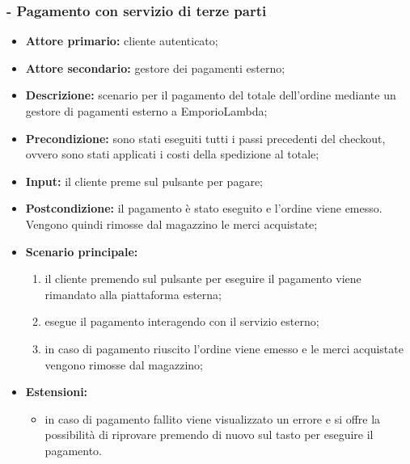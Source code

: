 \subsubsection{ - Pagamento con servizio di terze parti}
\begin{itemize}
    \item \textbf{Attore primario:} cliente autenticato;
    \item \textbf{Attore secondario:} gestore dei pagamenti esterno;
    \item \textbf{Descrizione:} scenario per il pagamento del totale dell'ordine mediante un gestore di pagamenti esterno a EmporioLambda;
    \item \textbf{Precondizione:} sono stati eseguiti tutti i passi precedenti del checkout, ovvero sono stati applicati i costi della spedizione al totale;
    \item \textbf{Input:} il cliente preme sul pulsante per pagare;
    \item \textbf{Postcondizione:} il pagamento è stato eseguito e l'ordine viene emesso. Vengono quindi rimosse dal magazzino le merci acquistate;
    \item \textbf{Scenario principale:}
          \begin{enumerate}
              \item il cliente premendo sul pulsante per eseguire il pagamento viene rimandato alla piattaforma esterna;
              \item esegue il pagamento interagendo con il servizio esterno;
              \item in caso di pagamento riuscito l'ordine viene emesso e le merci acquistate vengono rimosse dal magazzino;
          \end{enumerate}
    \item \textbf{Estensioni:}
          \begin{itemize}
              \item in caso di pagamento fallito viene visualizzato un errore e si offre la possibilità di riprovare premendo di nuovo sul tasto per eseguire il pagamento.
          \end{itemize}
\end{itemize}

\stepUserCase
